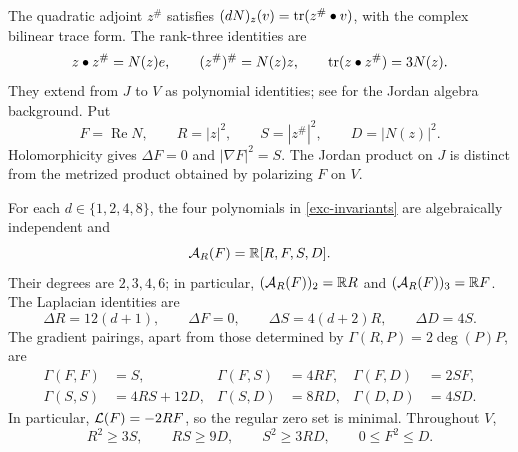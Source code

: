 The quadratic adjoint \(z^\#\) satisfies
\((dN)_z(v)=\operatorname{tr}(z^\#\bullet v)\), with the complex bilinear
trace form. The rank-three identities are
\begin{equation}\label{exc-adjoint}
 z\bullet z^\#=N(z)e,\qquad
 (z^\#)^\#=N(z)z,\qquad
 \operatorname{tr}(z\bullet z^\#)=3N(z).
\end{equation}
They extend from \(J\) to \(V\) as polynomial identities; see
\cite[Section~3.2.7]{NadirashviliTkachevVladut14} for the Jordan algebra
background. Put
\begin{equation}\label{exc-invariants}
 F=\operatorname{Re}N,\qquad R=|z|^2,\qquad
 S=|z^\#|^2,\qquad D=|N(z)|^2.
\end{equation}
Holomorphicity gives \(\Delta F=0\) and \(|\nabla F|^2=S\).
The Jordan product on \(J\) is distinct from the metrized product
obtained by polarizing \(F\) on \(V\).

\begin{theorem}
\label{thm:exc-jordan-closure}
For each \(d\in\{1,2,4,8\}\), the four polynomials in
\eqref{exc-invariants} are algebraically independent and
\[
 \mathcal A_R(F)=\mathbb R[R,F,S,D].
\]
Their degrees are \(2,3,4,6\); in particular,
\((\mathcal A_R(F))_2=\mathbb R R\) and \((\mathcal A_R(F))_3=\mathbb R F\).
The Laplacian identities are
\begin{equation}\label{exc-jordan-laplacians}
 \Delta R=12(d+1),\qquad \Delta F=0,\qquad
 \Delta S=4(d+2)R,\qquad \Delta D=4S.
\end{equation}
The gradient pairings, apart from those determined by
\(\Gamma(R,P)=2\deg(P)P\), are
\begin{equation}\label{exc-gradient-table}
\begin{aligned}
 \Gamma(F,F)&=S,& \Gamma(F,S)&=4RF,& \Gamma(F,D)&=2SF,\\
 \Gamma(S,S)&=4RS+12D,& \Gamma(S,D)&=8RD,&
 \Gamma(D,D)&=4SD.
\end{aligned}
\end{equation}
In particular, \(\mathcal L(F)=-2RF\), so the regular zero set is minimal.
Throughout \(V\),
\begin{equation}\label{exc-global-inequalities}
 R^2\geq3S,\qquad RS\geq9D,\qquad S^2\geq3RD,
 \qquad 0\leq F^2\leq D.
\end{equation}
\end{theorem}

